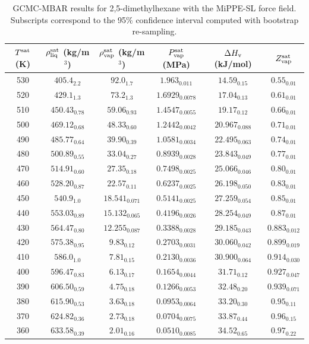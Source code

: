 \documentclass[journal=jctc,manuscript=article]{achemso}
\begin{document}
\begin{table}[htb!]
	\caption{GCMC-MBAR results for 2,5-dimethylhexane with the MiPPE-SL force field. Subscripts correspond to the 95\% confidence interval computed with bootstrap re-sampling.}
	\begin{center}
		\begin{tabular}{|c|c|c|c|c|c|}
			\hline
			$T^{\rm sat}$ (K) & $\rho_{\rm liq}^{\rm sat}$ (kg/m$^3$) & $\rho_{\rm vap}^{\rm sat}$ (kg/m$^3$) & $P_{\rm vap}^{\rm sat}$ (MPa) & $\Delta H_{\rm v}$ (kJ/mol) & $Z_{\rm vap}^{\rm sat}$ \\ \hline
			530 & $405.4_{2.2}$ & $92.0_{1.7}$ & $1.963_{0.011}$ & $14.59_{0.15}$ & $0.55_{0.01}$ \\
			520 & $429.1_{1.3}$ & $73.2_{1.3}$ & $1.6929_{0.0078}$ & $17.04_{0.13}$ & $0.61_{0.01}$ \\
			510 & $450.43_{0.78}$ & $59.06_{0.93}$ & $1.4547_{0.0055}$ & $19.17_{0.12}$ & $0.66_{0.01}$ \\
			500 & $469.12_{0.68}$ & $48.33_{0.60}$ & $1.2442_{0.0042}$ & $20.967_{0.088}$ & $0.71_{0.01}$ \\
			490 & $485.77_{0.64}$ & $39.90_{0.39}$ & $1.0581_{0.0034}$ & $22.495_{0.063}$ & $0.74_{0.01}$ \\
			480 & $500.89_{0.55}$ & $33.04_{0.27}$ & $0.8939_{0.0028}$ & $23.843_{0.049}$ & $0.77_{0.01}$ \\
			470 & $514.91_{0.60}$ & $27.35_{0.18}$ & $0.7498_{0.0025}$ & $25.066_{0.046}$ & $0.80_{0.01}$ \\
			460 & $528.20_{0.87}$ & $22.57_{0.11}$ & $0.6237_{0.0025}$ & $26.198_{0.050}$ & $0.83_{0.01}$ \\
			450 & $540.9_{1.0}$ & $18.541_{0.071}$ & $0.5141_{0.0025}$ & $27.259_{0.054}$ & $0.85_{0.01}$ \\
			440 & $553.03_{0.89}$ & $15.132_{0.065}$ & $0.4196_{0.0026}$ & $28.254_{0.049}$ & $0.87_{0.01}$ \\
			430 & $564.47_{0.80}$ & $12.255_{0.087}$ & $0.3388_{0.0028}$ & $29.185_{0.043}$ & $0.883_{0.012}$ \\
			420 & $575.38_{0.95}$ & $9.83_{0.12}$ & $0.2703_{0.0031}$ & $30.060_{0.042}$ & $0.899_{0.019}$ \\
			410 & $586.0_{1.0}$ & $7.81_{0.15}$ & $0.2130_{0.0036}$ & $30.900_{0.064}$ & $0.914_{0.030}$ \\
			400 & $596.47_{0.83}$ & $6.13_{0.17}$ & $0.1654_{0.0044}$ & $31.71_{0.12}$ & $0.927_{0.047}$ \\
			390 & $606.50_{0.59}$ & $4.75_{0.18}$ & $0.1266_{0.0053}$ & $32.48_{0.20}$ & $0.939_{0.071}$ \\
			380 & $615.90_{0.53}$ & $3.63_{0.18}$ & $0.0953_{0.0064}$ & $33.20_{0.30}$ & $0.95_{0.11}$ \\
			370 & $624.82_{0.36}$ & $2.73_{0.18}$ & $0.0704_{0.0075}$ & $33.87_{0.44}$ & $0.96_{0.15}$ \\
			360 & $633.58_{0.39}$ & $2.01_{0.16}$ & $0.0510_{0.0085}$ & $34.52_{0.65}$ & $0.97_{0.22}$ \\
			\hline
		\end{tabular}
	\end{center}
\end{table}
\end{document}
